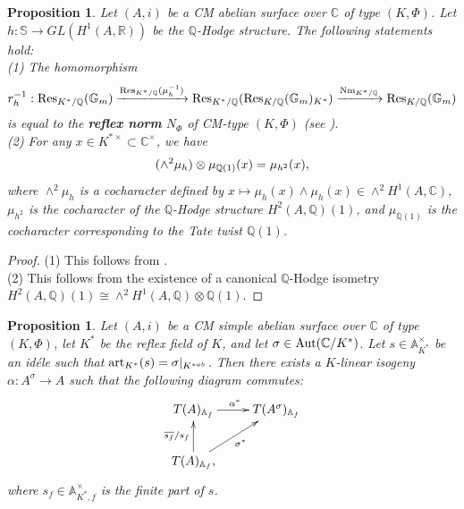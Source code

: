 \documentclass[reqno,a4paper,11pt]{amsart}
\newtheorem{prop}[dfn]{Proposition}
\theoremstyle{definition}
\theoremstyle{definition}
\begin{document}
      \begin{prop}\label{rh}Let $(A, i)$ be a CM abelian surface over $\mathbb{C}$ of type $(K, \Phi)$. Let $h:\mathbb{S}\to GL(H^{1}(A, \mathbb{R}))$ be the $\mathbb{Q}$-Hodge structure. The  following statements hold: 
      \\\indent (1) The homomorphism 
      \begin{align}
         r_{h}^{-1}: {\rm Res}_{K^{\ast}/\mathbb{Q}}(\mathbb{G}_{m})\xrightarrow{{\rm Res}_{K^{\ast}/\mathbb{Q}}(\mu^{-1}_h)}{\rm Res}_{K^{\ast}/\mathbb{Q}}({\rm Res}_{K/\mathbb{Q}}(\mathbb{G}_{m})_{K^{\ast}})\xrightarrow{{\rm Nm}_{K^{\ast}/\mathbb{Q}}}{\rm Res}_{K/\mathbb{Q}}(\mathbb{G}_{m}) \notag 
      \end{align}is equal to the  \textbf{reflex norm} $N_{\Phi}$ of CM-type $(K, \Phi)$ (see \cite[2.1.3.3. Definition]{cco}).
      \\\indent (2)  For any $x\in K^{\ast\times}\subset \mathbb{C}^{\times}$,   we have  \begin{align}
        (\wedge^{2}\mu_{h})\otimes \mu_{\mathbb{Q}(1)}(x)=\mu_{h^{2}}(x), \notag 
        \end{align}
        where $\wedge^{2}\mu_{h}$ is a cocharacter defined by $x\mapsto \mu_{h}(x)\wedge\mu_{h}(x)\in \wedge^{2}H^{1}(A, \mathbb{C})$, $\mu_{h^{2}}$ is the cocharacter of the $\mathbb{Q}$-Hodge structure $H^{2}(A, \mathbb{Q})(1)$, and $\mu_{\mathbb{Q}(1)}$ is the cocharacter corresponding to the Tate twist $\mathbb{Q}(1)$. 
      \end{prop}
      \begin{proof}
      (1) 
      This follows from \cite[2.1.3.4. Proposition]{cco}. 
      \\(2) This follows from the existence of a canonical $\mathbb{Q}$-Hodge isometry $H^{2}(A, \mathbb{Q})(1)\cong \wedge^{2}H^{1}(A, \mathbb{Q})\otimes \mathbb{Q}(1)$. 
          
      \end{proof}
      \begin{prop}\label{simplecm} Let $(A, i)$ be a CM simple abelian surface over $\mathbb{C}$ of type $(K, \Phi)$, let $K^{\ast}$ be the reflex field of $K$, and let $\sigma\in {\rm Aut}(\mathbb{C}/K^{\ast})$. Let $s\in\mathbb{A}^{\times}_{K^{\ast}}$ be an id\'ele such that ${\rm art}_{K^{\ast}}(s)=\sigma|_{K^{\ast ab}}$. Then there exists a $K$-linear isogeny $\alpha: A^{\sigma}\to A$ such that the following diagram commutes:
          \begin{align}
              \xymatrix{T(A)_{\mathbb{A}_{f}}\ar[r]^{\alpha^{\ast}}& T(A^{\sigma})_{\mathbb{A}_{f}}\\ T(A)_{\mathbb{A}_{f}},\ar[u]^{\overline{s_{f}}/s_{f}}\ar[ur]_{\sigma^{\ast}}} \notag 
          \end{align}
           where $s_{f}\in \mathbb{A}^{\times}_{K^{\ast}, f}$ is the finite part of $s$. 
      \end{prop}
\end{document}

